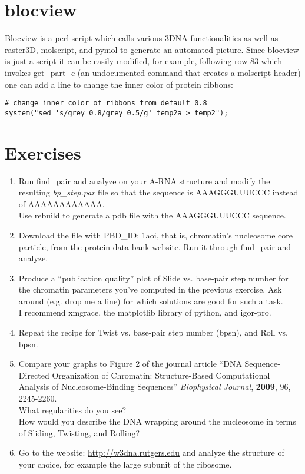 \section{blocview}
Blocview is a perl script  which calls various 3DNA functionalities as
well  as  raster3D, molscript,  and  pymol  to  generate an  automated
picture. Since  blocview is just a  script it can  be easily modified,
for example, following row 83 which invokes get\_part -c (an
undocumented command that creates a molscript header) one  can add a
line to change the inner color of protein ribbons:
\begin{Verbatim}
# change inner color of ribbons from default 0.8
system("sed 's/grey 0.8/grey 0.5/g' temp2a > temp2");
\end{Verbatim}

\section{Exercises}
\begin{enumerate}
\item{Run   \textrm{find\_pair}  and  \textrm{analyze}   on  your  A-RNA
structure and modify the  resulting \textit{bp\_step.par} file so that
the sequence is AAAGGGUUUCCC instead of AAAAAAAAAAAA.\\
Use rebuild to generate a pdb file with the AAAGGGUUUCCC sequence.}
\item{Download the file with PBD\_ID: 1aoi, that is, chromatin's
nucleosome core particle,  from the protein data bank  website. Run it
through \textrm{find\_pair} and \textrm{analyze}.}
\item{Produce a  ``publication quality''  plot of Slide  vs. base-pair
    step number  for the chromatin  parameters you've computed  in the
    previous exercise.  Ask around (e.g.  drop me a line) for which solutions
    are  good  for  such  a  task.\\ I  recommend  \textrm{xmgrace},  the
   \textrm{matplotlib} library of \textrm{python}, and  \textrm{igor-pro}.}
\item{Repeat the recipe for Twist vs. base-pair step number (bpsn), and Roll
    vs. bpsn.}
\item{Compare your  graphs to  Figure 2 of  the journal  article ``DNA
    Sequence-Directed   Organization  of   Chromatin:  Structure-Based
    Computational    Analysis   of    Nucleosome-Binding   Sequences''
    \textit{Biophysical Journal}, \textbf{2009}, 96, 2245-2260.\\  What
    regularities do  you see?\\  How would you  describe the  DNA wrapping
    around the nucleosome in terms of Sliding, Twisting, and Rolling?}
\item{Go  to the  website: \url{http://w3dna.rutgers.edu}  and analyze
    the structure of your choice, for example the large subunit of the
  ribosome.}
\end{enumerate}

